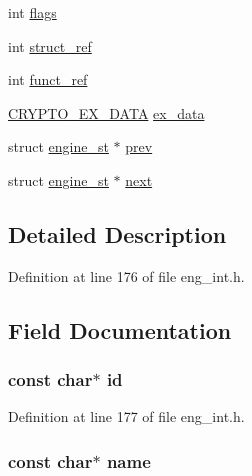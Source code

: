 \begin{DoxyCompactItemize}
\item 
int \hyperlink{structengine__st_ac8bf36fe0577cba66bccda3a6f7e80a4}{flags}
\item 
int \hyperlink{structengine__st_a81a10e0a097523e9a3bf969860eaaf7f}{struct\+\_\+ref}
\item 
int \hyperlink{structengine__st_a68953c096a57eea2c904bca11e034d16}{funct\+\_\+ref}
\item 
\hyperlink{crypto_2ossl__typ_8h_a7eaff1c18057495d8af18f22d1370b51}{C\+R\+Y\+P\+T\+O\+\_\+\+E\+X\+\_\+\+D\+A\+TA} \hyperlink{structengine__st_ac3e4fd59d6ee44a81f3a58114613c1e2}{ex\+\_\+data}
\item 
struct \hyperlink{structengine__st}{engine\+\_\+st} $\ast$ \hyperlink{structengine__st_a020cc7e6f120044f438984ca9eb57295}{prev}
\item 
struct \hyperlink{structengine__st}{engine\+\_\+st} $\ast$ \hyperlink{structengine__st_abff10beeedd45eeb4a3905a6ad16ec41}{next}
\end{DoxyCompactItemize}


\subsection{Detailed Description}


Definition at line 176 of file eng\+\_\+int.\+h.



\subsection{Field Documentation}
\subsubsection[{\texorpdfstring{id}{id}}]{\setlength{\rightskip}{0pt plus 5cm}const char$\ast$ id}\hypertarget{structengine__st_aeffa2f0815ce90fecbda9aac199143db}{}\label{structengine__st_aeffa2f0815ce90fecbda9aac199143db}


Definition at line 177 of file eng\+\_\+int.\+h.

\subsubsection[{\texorpdfstring{name}{name}}]{\setlength{\rightskip}{0pt plus 5cm}const char$\ast$ name}\hypertarget{structengine__st_a8f8f80d37794cde9472343e4487ba3eb}{}\label{structengine__st_a8f8f80d37794cde9472343e4487ba3eb}


